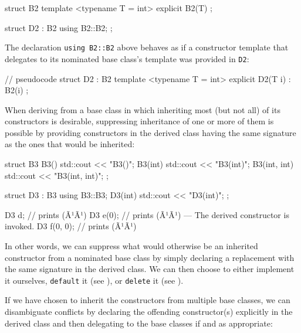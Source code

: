 \begin{emcppslisting}[language=C++]
struct B2
{
    template <typename T = int>
    explicit B2(T) { }
};

struct D2 : B2 { using B2::B2; };
\end{emcppslisting}
    
\noindent The declaration \lstinline!using!~\lstinline!B2::B2! above behaves as if a
constructor template that delegates to its nominated base class's
template was provided in \lstinline!D2!:

\begin{emcppslisting}[language=C++]
// pseudocode
struct D2 : B2
{
    template <typename T = int>
    explicit D2(T i) : B2(i) { }
};
\end{emcppslisting}
    
\noindent When deriving from a base class in which inheriting most
(but not all) of its constructors is desirable, suppressing
inheritance of one or more of them is possible by providing constructors in the
derived class having the same signature as the ones that would be
inherited:

\begin{emcppslisting}[language=C++]
struct B3
{
    B3()         { std::cout << "B3()\n"; }
    B3(int)      { std::cout << "B3(int)\n"; }
    B3(int, int) { std::cout << "B3(int, int)\n"; }
};

struct D3 : B3
{
    using B3::B3;
    D3(int) { std::cout << "D3(int)\n"; }
};

D3 d;        // prints (Ã¹{}Ã¹)
D3 e(0);     // prints (Ã¹{}Ã¹) --- The derived constructor is invoked.
D3 f(0, 0);  // prints (Ã¹{}Ã¹)
\end{emcppslisting}
    
\noindent In other words, we can suppress what would otherwise be an inherited
constructor from a nominated base class by simply declaring a
replacement with the same signature in the derived class. We can then
choose to either implement it ourselves, \lstinline!default! it (see ), 
or \lstinline!delete! it (see ). 

If we have chosen to inherit the constructors from multiple
base classes, we can disambiguate conflicts by declaring the offending
constructor(s) explicitly in the derived class and then delegating to
the base classes if and as appropriate:

